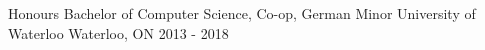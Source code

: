 \begin{cventries}
  \cventry
    {Honours Bachelor of Computer Science, Co-op, German Minor}
    {University of Waterloo}
    {Waterloo, ON}
    {2013 - 2018}
    {}
\end{cventries}
